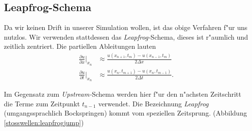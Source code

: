 \begin{refsection}
\subsection{Leapfrog-Schema}
\label{stosswellen:kleapfrog}
Da wir keinen Drift in unserer Simulation wollen, ist das obige Verfahren
f"ur uns nutzlos. Wir verwenden stattdessen das \textit{Leapfrog-}Schema,
dieses ist r"aumlich und zeitlich zentriert. Die partiellen Ableitungen
lauten 
\begin{align}
	\frac{\partial u}{\partial x} \Bigg|_{x_{n}} &\approx \frac{u(x_{n\!+\!1},t_{m})-u(x_{n\!-\!1},t_{m})}{2\Delta x}
	\label{stosswellen:leapfrog1} \\
	\frac{\partial u}{\partial t} \Bigg|_{x_{n}} &\approx\frac{u(x_{n},t_{m\!+\!1})-u(x_{n},t_{m\!-\!1})}{2\Delta t}.
	\label{stosswellen:leapfrog2}
\end{align}

Im Gegensatz zum \textit{Upstream-}Schema werden hier f"ur den n"achsten
Zeitschritt die Terme zum Zeitpunkt $t_{n\!-\!1}$ verwendet. Die
Bezeichnung \textit{Leapfrog} (umgangssprachlich Bockspringen) kommt
vom speziellen Zeitsprung. (Abbildung \ref{stosswellen:leapfrogjump})

\begin{center}

\label{stosswellen:leapfrogjump}
\end{center}


\end{refsection}
